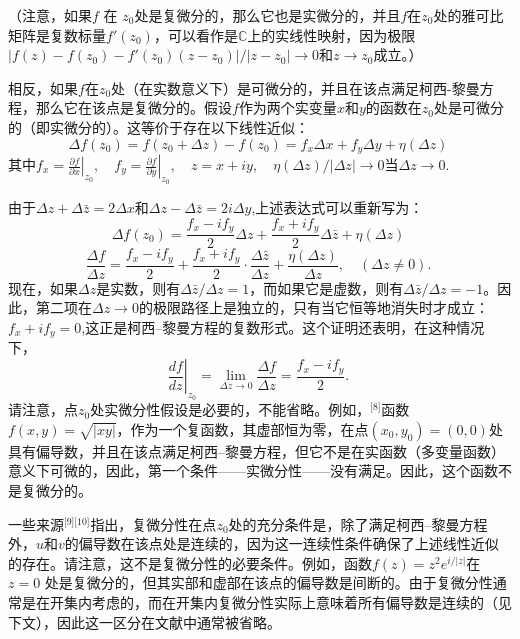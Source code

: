 （注意，如果\( f \) 在 \( z_0 \)处是复微分的，那么它也是实微分的，并且\( f \)在\( z_0 \)处的雅可比矩阵是复数标量\( f'(z_0) \)，可以看作是\( \mathbb{C} \)上的实线性映射，因为极限\(|f(z) - f(z_0) - f'(z_0)(z - z_0)|/|z - z_0| \to 0\)和\(z \to z_0\)成立。）

相反，如果\( f \)在\( z_0 \)处（在实数意义下）是可微分的，并且在该点满足柯西-黎曼方程，那么它在该点是复微分的。假设\( f \)作为两个实变量\( x \)和\( y \)的函数在\( z_0 \)处是可微分的（即实微分的）。这等价于存在以下线性近似：
\[
\Delta f(z_0) = f(z_0 + \Delta z) - f(z_0) = f_x \Delta x + f_y \Delta y + \eta(\Delta z)~
\]
其中\(f_x = \left. \frac{\partial f}{\partial x} \right|_{z_0}, \quad f_y = \left. \frac{\partial f}{\partial y} \right|_{z_0}, \quad z = x + iy, \quad \eta(\Delta z) / |\Delta z| \to 0\)当\(\Delta z \to 0\).

由于\(\Delta z + \Delta \bar{z} = 2 \Delta x \)和\(\Delta z - \Delta \bar{z} = 2i \Delta y\),上述表达式可以重新写为：
\[
\Delta f(z_0) = \frac{f_x - i f_y}{2} \Delta z + \frac{f_x + i f_y}{2} \Delta \bar{z} + \eta(\Delta z)~
\]
\[
\frac{\Delta f}{\Delta z} = \frac{f_x - i f_y}{2} + \frac{f_x + i f_y}{2} \cdot \frac{\Delta \bar{z}}{\Delta z} + \frac{\eta(\Delta z)}{\Delta z}, \quad (\Delta z \neq 0).~
\]
现在，如果\( \Delta z \)是实数，则有\(\Delta \bar{z}/\Delta z=1\)，而如果它是虚数，则有\(\Delta \bar{z}/\Delta z=-1\)。因此，第二项在\( \Delta z \to 0 \)的极限路径上是独立的，只有当它恒等地消失时才成立：\(f_x + i f_y = 0\),这正是柯西–黎曼方程的复数形式。这个证明还表明，在这种情况下，
\[
\left. \frac{df}{dz} \right|_{z_0} = \lim_{\Delta z \to 0} \frac{\Delta f}{\Delta z} = \frac{f_x - i f_y}{2}.~
\]
请注意，点\( z_0 \)处实微分性假设是必要的，不能省略。例如，\(^\text{[8]}\)函数\(f(x, y)=\sqrt{|xy|}\)，作为一个复函数，其虚部恒为零，在点\((x_0, y_0) = (0, 0)\)处具有偏导数，并且在该点满足柯西–黎曼方程，但它不是在实函数（多变量函数）意义下可微的，因此，第一个条件——实微分性——没有满足。因此，这个函数不是复微分的。

一些来源\(^\text{[9][10]}\)指出，复微分性在点\(z_0\)处的充分条件是，除了满足柯西–黎曼方程外，\( u \)和\( v \)的偏导数在该点处是连续的，因为这一连续性条件确保了上述线性近似的存在。请注意，这不是复微分性的必要条件。例如，函数\(f(z) = z^2 e^{i/|z|}\)在\( z = 0 \) 处是复微分的，但其实部和虚部在该点的偏导数是间断的。由于复微分性通常是在开集内考虑的，而在开集内复微分性实际上意味着所有偏导数是连续的（见下文），因此这一区分在文献中通常被省略。
